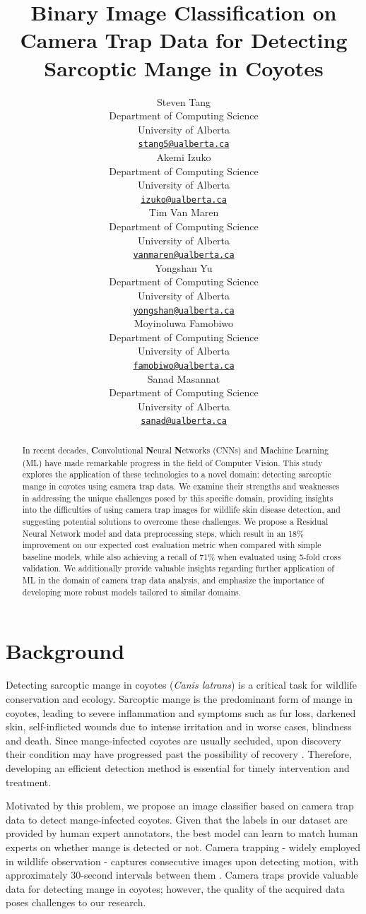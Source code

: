 \documentclass{article}
\title{Binary Image Classification on Camera Trap Data for Detecting Sarcoptic Mange in Coyotes
}
\author{
  Steven Tang \\
  Department of Computing Science \\
  University of Alberta \\
  \href{mailto: stang5@ualberta.ca}{\texttt{stang5@ualberta.ca}} \\
  \And 
  Akemi Izuko \\
  Department of Computing Science \\
  University of Alberta \\
  \href{mailto: izuko@ualberta.ca}{\texttt{izuko@ualberta.ca}} \\
  \And 
  Tim Van Maren \\
  Department of Computing Science \\
  University of Alberta \\
  \href{mailto: vanmaren@ualberta.ca}{\texttt{vanmaren@ualberta.ca}} \\
  \And 
  Yongshan Yu \\
  Department of Computing Science \\
  University of Alberta \\
  \href{mailto: yongshan@ualberta.ca}{\texttt{yongshan@ualberta.ca}} \\
  \And
  Moyinoluwa Famobiwo \\
  Department of Computing Science \\
  University of Alberta \\
  \href{mailto: famobiwo@ualberta.ca}{\texttt{famobiwo@ualberta.ca}} \\
  \And
  Sanad Masannat \\
  Department of Computing Science \\
  University of Alberta \\
  \href{mailto: sanad@ualberta.ca}{\texttt{sanad@ualberta.ca}} \\
}
\begin{document}
\maketitle


\begin{abstract}
In recent decades, \textbf{C}onvolutional \textbf{N}eural \textbf{N}etworks (CNNs) and \textbf{M}achine \textbf{L}earning (ML) have made remarkable progress in the field of Computer Vision. This study explores the application of these technologies to a novel domain: detecting sarcoptic mange in coyotes using camera trap data. We examine their strengths and weaknesses in addressing the unique challenges posed by this specific domain, providing insights into the difficulties of using camera trap images for wildlife skin disease detection, and suggesting potential solutions to overcome these challenges. We propose a Residual Neural Network model and data preprocessing steps, which result in an 18\% improvement on our expected cost evaluation metric when compared with simple baseline models, while also achieving a recall of 71\% when evaluated using 5-fold cross validation. We additionally provide valuable insights regarding further application of ML in the domain of camera trap data analysis, and emphasize the importance of developing more robust models tailored to similar domains.
\end{abstract}

\section{Background}
Detecting sarcoptic mange in coyotes (\textit{Canis latrans}) is a critical task for wildlife conservation and ecology. Sarcoptic mange is the predominant form of mange in coyotes, leading to severe inflammation and symptoms such as fur loss, darkened skin, self-inflicted wounds due to intense irritation \cite{Murray2021} and in worse cases, blindness and death. Since mange-infected coyotes are usually secluded, upon discovery their condition may have progressed past the possibility of recovery \cite{C469Meeting}. Therefore, developing an efficient detection method is essential for timely intervention and treatment.

Motivated by this problem, we propose an image classifier based on camera trap data to detect mange-infected coyotes. Given that the labels in our dataset are provided by human expert annotators, the best model can learn to match human experts on whether mange is detected or not. Camera trapping - widely employed in wildlife observation - captures consecutive images upon detecting motion, with approximately 30-second intervals between them \cite{C469Meeting}. Camera traps provide valuable data for detecting mange in coyotes; however, the quality of the acquired data poses challenges to our research.
\end{document}
